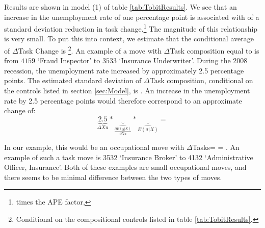 \documentclass[12pt,authoryear]{elsarticle}
\begin{document}
	\newpage
\clearpage
	
	
	 Results are shown in model (1) of table \ref{tab:TobitResults}. We see that an increase in the unemployment rate of one percentage point is associated with \hspace{-1mm} of a standard deviation reduction in task change.\footnote{\hspace{-1mm} times the APE factor, \hspace{-1mm}} The magnitude of this relationship is very small. To put this into context, we estimate that the conditional average of $\Delta$Task Change is \hspace{-1mm}\footnote{Conditional on the compositional controls listed in table \ref{tab:TobitResults}.}. An example of a move with $\Delta$Task composition equal to \hspace{-1mm}  is from $4159$ `Fraud Inspector' to $3533$ `Insurance Underwriter'. During the 2008 recession, the unemployment rate increased by approximately 2.5 percentage points. The estimated standard deviation of $\Delta$Task composition, conditional on the controls listed in section \ref{sec:Model}, is \hspace{-1mm}. An increase in the unemployment rate by 2.5 percentage points would therefore correspond to an approximate change of:
	\[
	\underbrace{2.5}_{\Delta Xu}* \underbrace{}_{\widehat{\frac{\partial E(y| X)}{\partial Xu}}} *\underbrace{}_{ \widehat{E(\sigma|X)}} = 
	\]
	
	\noindent In our example, this would be an occupational move with $\Delta$Tasks=\hspace{-1mm}  =  \hspace{-1.5mm}. An example of such a task move is 3532 `Insurance Broker' to 4132 `Administrative Officer, Insurance'. Both of these examples are small occupational moves, and there seems to be minimal difference between the two types of moves.
	
\end{document}

